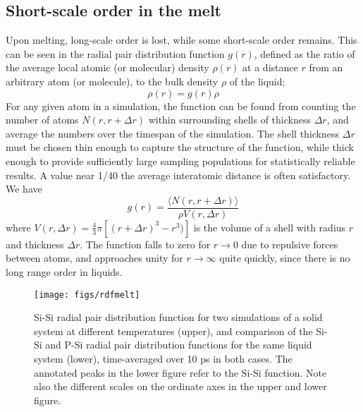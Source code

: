\documentclass[11pt,bibliography=totoc,index=totoc]{scrbook}   %
\begin{document}
%
\subsection{Short-scale order in the melt}\label{sec:pair-distribution}
%

Upon melting, long-scale order is lost, while some short-scale order remains. 
This can be seen in the radial pair distribution function $g(r)$, defined as the ratio of the average local atomic (or molecular) density $\rho(r)$ at a distance $r$ from an arbitrary atom (or molecule), to the bulk density $\rho$ of the liquid;\cite{Kirkwood:1968}
\begin{equation}
  \rho(r) = g(r) \rho
\end{equation}
For any given atom in a simulation, the function can be found from counting the number of atoms $N(r,r+\Delta r)$ within surrounding shells of thickness $\Delta r$, and average the numbers over the timespan of the simulation. 
The shell thickness $\Delta r$ must be chosen thin enough to capture the structure of the function, 
while thick enough to provide sufficiently large sampling populations for statistically reliable results. 
A value near 1/40 the average interatomic distance is often satisfactory.\cite[263]{Haile:1992} 
We have
\begin{equation}
    g(r) = \frac{\langle N(r,r+\Delta r) \rangle}{\rho V(r,\Delta r)}
  \label{eq:gofr}
\end{equation}
where $V(r,\Delta r) = \frac{4}{3}\pi [(r+\Delta r)^3 - r^3)]$ is the volume of a shell with radius $r$ and thickness $\Delta r$.
The function falls to zero for $r\to 0$ due to repulsive forces between atoms, and approaches unity for $r\to\infty$ quite quickly, since there is no long range order in liquids.

% 
\begin{figure}[htbp]
  \centering
  \texttt{[image: figs/rdfmelt]}
  \caption{Si-Si radial pair distribution function for two simulations of a solid system at different temperatures (upper), and
  comparison of the Si-Si and P-Si radial pair distribution functions for the same liquid system (lower), 
  time-averaged over 10 ps in both cases. 
  The annotated peaks in the lower figure refer to the Si-Si function.
  Note also the different scales on the ordinate axes in the upper and lower figure.}
  \label{fig:pcf}
\end{figure}
\end{document}
